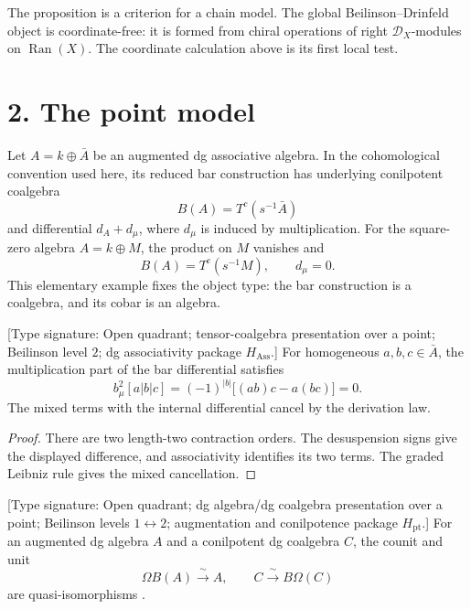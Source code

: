 The proposition is a criterion for a chain model.  The global
Beilinson--Drinfeld object is coordinate-free: it is formed from
chiral operations of right \(\mathcal D_X\)-modules on
\(\operatorname{Ran}(X)\).  The coordinate calculation above is its
first local test.

\section*{2.  The point model}

Let \(A=k\oplus\bar A\) be an augmented dg associative algebra.  In
the cohomological convention used here, its reduced bar construction
has underlying conilpotent coalgebra
\[
 B(A)=T^c(s^{-1}\bar A)
\]
and differential \(d_A+d_\mu\), where \(d_\mu\) is induced by
multiplication.  For the square-zero algebra \(A=k\oplus M\), the
product on \(M\) vanishes and
\[
 B(A)=T^c(s^{-1}M),\qquad d_\mu=0.
\]
This elementary example fixes the object type: the bar construction
is a coalgebra, and its cobar is an algebra.

\begin{proposition}
\label{prop:preface-associative-bar-three}
\textup{[Type signature: Open quadrant; tensor-coalgebra
presentation over a point; Beilinson level \(2\); dg associativity
package \(H_{\mathrm{Ass}}\).]}
For homogeneous \(a,b,c\in\bar A\), the multiplication part of the
bar differential satisfies
\[
 b_\mu^2[a|b|c]
 =(-1)^{|b|}\bigl[(ab)c-a(bc)\bigr]=0.
\]
The mixed terms with the internal differential cancel by the
derivation law.
\end{proposition}

\begin{proof}
There are two length-two contraction orders.  The desuspension signs
give the displayed difference, and associativity identifies its two
terms.  The graded Leibniz rule gives the mixed cancellation.
\end{proof}

\begin{theorem}
\label{thm:preface-point-bar-cobar}
\textup{[Type signature: Open quadrant; dg algebra/dg coalgebra
presentation over a point; Beilinson levels \(1\leftrightarrow2\);
augmentation and conilpotence package \(H_{\mathrm{pt}}\).]}
For an augmented dg algebra \(A\) and a conilpotent dg coalgebra
\(C\), the counit and unit
\[
 \Omega B(A)\xrightarrow{\ \sim\ }A,
 \qquad
 C\xrightarrow{\ \sim\ }B\Omega(C)
\]
are quasi-isomorphisms
\cite[Corollary~2.3.4]{LV12}.
\end{theorem}

